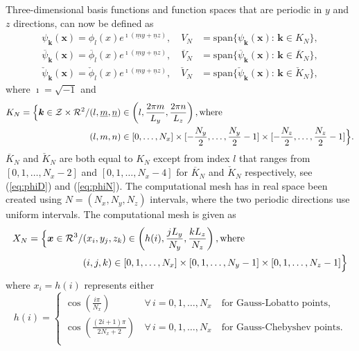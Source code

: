 \documentclass[11pt, oneside]{article}
\newcommand{\N}[1]{\check{#1}}
\newcommand{\D}[1]{\overline{#1}}
\begin{document}
Three-dimensional basis functions and function spaces that are periodic in $y$ 
and $z$ directions, can now be defined as
\begin{align}
  \psi_{\bm{k}}(\bm{x}) = \phi_{l}(x)e^{ \imath(\underline{m} y + \underline{n} z)}, \quad V_N &= \text{span} \{ \psi_{\bm{k}}(\bm{x}):\, \bm{k} \in K_N  \}, \\
  \D{\psi}_{\bm{k}}(\bm{x}) = \D{\phi}_{l}(x)e^{ \imath(\underline{m} y + \underline{n} z)}, \quad \D{V}_N &= \text{span} \{ \D{\psi}_{\bm{k}}(\bm{x}):\, \bm{k} \in \D{K}_N  \}, \\
  \N{\psi}_{\bm{k}}(\bm{x}) = \N{\phi}_{l}(x)e^{ \imath(\underline{m} y + \underline{n} z)}, \quad \N{V}_N &= \text{span} \{ \N{\psi}_{\bm{k}}(\bm{x}):\, \bm{k} \in \N{K}_N  \},
\end{align}
where $\imath=\sqrt{-1}$ and 
\begin{align}
K_N = \Big\{\bm{k} \in \mathcal{Z}\times\mathcal{R}^2 / &(l, \underline{m}, \underline{n}) \in \left( l, \frac{2 \pi m}{L_y}, \frac{2 \pi n}{L_z} \right), \text{where} \notag \\
 &(l, m, n) \in  [0, \ldots, N_x] \times [-\frac{N_y}{2},\ldots, \frac{N_y}{2}-1] \times[-\frac{N_z}{2},\ldots, \frac{N_z}{2}-1] \Big\}. \label{eq:wavenumbermesh}
\end{align}
$\D{K}_N$ and $\N{K}_N$ are both equal to $K_N$ except from index $l$ that 
ranges from $[0, 1, \ldots, N_x-2]$ and $[0, 1, \ldots, N_x-4]$ for $\D{K}_N$ 
and $\N{K}_N$ respectively, see (\ref{eq:phiD}) and (\ref{eq:phiN}). The 
computational mesh has in real space been created using $N = (N_x, N_y, N_z)$ 
intervals, where the two periodic directions use uniform intervals. The 
computational mesh is given as
\begin{align}
  X_N = \Big\{ \bm{x} \in \mathcal{R}^3/&(x_i, y_j, z_k) \in \left( h(i), \frac{jL_y}{N_y}, \frac{kL_z}{N_z} \right), \text{where} \notag \\
  &(i, j, k) \in [0, 1, \ldots, N_x] \times [0, 1, \ldots, N_y-1] \times [0, 1, \ldots, N_z-1] \Big\} \label{eq:Xn}
\end{align}
where $x_i = h(i)$ represents either
\begin{equation}
 h(i) = \begin{cases}
   \cos \left(\frac{i \pi }{N_x} \right) \, &\forall \, i=0,1, \ldots, N_x \quad  \text{for Gauss-Lobatto points}, \\
   \cos \left(\frac{(2i +1)\pi}{2N_x+2} \right) \, &\forall \, i=0,1, \ldots, N_x \quad  \text{for Gauss-Chebyshev points}. \\
 \end{cases}
\end{equation}
\end{document}
